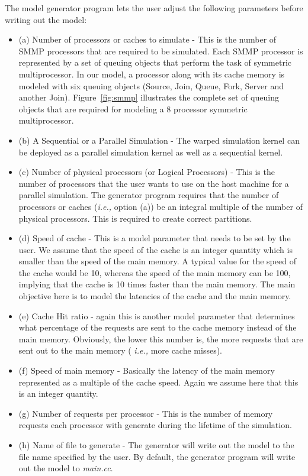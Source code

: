 \documentclass[11pt]{report}
\begin{document}
The model generator program lets the user adjust the following parameters
before writing out the model:
\begin{itemize}
\item (a) Number of processors or caches to simulate - This is the number
of SMMP processors that are required to be simulated. Each SMMP processor
is represented by a set of queuing objects that perform the task of
symmetric multiprocessor. In our model, a processor along with its cache
memory is modeled with six queuing objects (Source, Join, Queue, Fork,
Server and another Join). Figure~\ref{fig:smmp} illustrates the complete
set of queuing objects that are required for modeling a 8 processor
symmetric multiprocessor.

\item (b) A Sequential or a Parallel Simulation - The {\sc warped}
simulation kernel can be deployed as a parallel simulation kernel as well
as a sequential kernel.

\item (c) Number of physical processors (or Logical Processors) - This is
the number of processors that the user wants to use on the host machine
for a parallel simulation. The generator program requires that the number
of processors or caches ({\it i.e.,} option (a)) be an integral multiple
of the number of physical processors. This is required to create correct
partitions. 

\item (d) Speed of cache - This is a model parameter that needs to be set
by the user. We assume that the speed of the cache is an integer quantity
which is smaller than the speed of the main memory. A typical value for
the speed of the cache would be 10, whereas the speed of the main memory
can be 100, implying that the cache is 10 times faster than the main
memory. The main objective here is to model the latencies of the cache and
the main memory.

\item (e) Cache Hit ratio - again this is another model parameter that
determines what percentage of the requests are sent to the cache memory
instead of the main memory. Obviously, the lower this number is, the more
requests that are sent out to the main memory ( {\it i.e.,} more cache
misses). 

\item (f) Speed of main memory - Basically the latency of the main memory
represented as a multiple of the cache speed. Again we assume here that
this is an integer quantity.

\item (g) Number of requests per processor - This is the number of memory
requests each processor with generate during the lifetime of the
simulation.

\item (h) Name of file to generate - The generator will write out the
model to the file name specified by the user. By default, the generator
program will write out the model to {\it main.cc}. 
\end{itemize}
\end{document}
